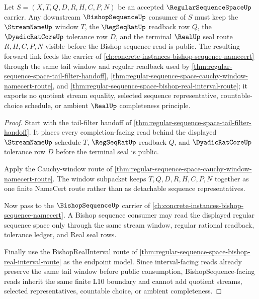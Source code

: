 \begin{theorem}
\label{thm:regular-sequence-space-bishop-sequence-forward-link}
Let $S=(X,T,Q,D,R,H,C,P,N)$ be an accepted $\RegularSequenceSpaceUp$ carrier. Any downstream $\BishopSequenceUp$ consumer of $S$ must keep the $\StreamNameUp$ window $T$, the $\RegSeqRatUp$ readback row $Q$, the $\DyadicRatCoreUp$ tolerance row $D$, and the terminal $\RealUp$ seal route $R,H,C,P,N$ visible before the Bishop sequence read is public. The resulting forward link feeds the carrier of \autoref{ch:concrete-instances-bishop-sequence-namecert} through the same tail window and regular readback used by \autoref{thm:regular-sequence-space-tail-filter-handoff}, \autoref{thm:regular-sequence-space-cauchy-window-namecert-route}, and \autoref{thm:regular-sequence-space-bishop-real-interval-route}; it exports no quotient stream equality, selected sequence representative, countable-choice schedule, or ambient $\RealUp$ completeness principle.
\end{theorem}
\begin{proof}
Start with the tail-filter handoff of \autoref{thm:regular-sequence-space-tail-filter-handoff}. It places every completion-facing read behind the displayed $\StreamNameUp$ schedule $T$, $\RegSeqRatUp$ readback $Q$, and $\DyadicRatCoreUp$ tolerance row $D$ before the terminal seal is public.

Apply the Cauchy-window route of \autoref{thm:regular-sequence-space-cauchy-window-namecert-route}. The window subpacket keeps $T,Q,D,R,H,C,P,N$ together as one finite NameCert route rather than as detachable sequence representatives.

Now pass to the $\BishopSequenceUp$ carrier of \autoref{ch:concrete-instances-bishop-sequence-namecert}. A Bishop sequence consumer may read the displayed regular sequence space only through the same stream window, regular rational readback, tolerance ledger, and Real seal rows.

Finally use the BishopRealInterval route of \autoref{thm:regular-sequence-space-bishop-real-interval-route} as the endpoint model. Since interval-facing reads already preserve the same tail window before public consumption, BishopSequence-facing reads inherit the same finite L10 boundary and cannot add quotient streams, selected representatives, countable choice, or ambient completeness.
\end{proof}


